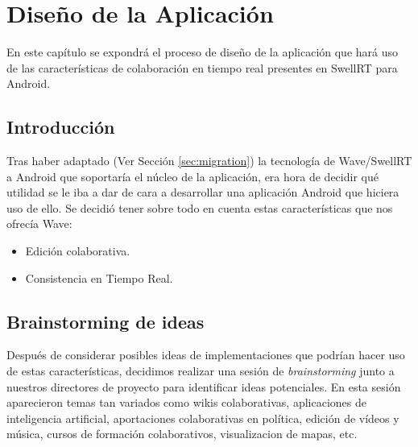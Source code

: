\newpage
\thispagestyle{sectioned}
\chapter{Diseño de la Aplicación}

En este capítulo se expondrá el proceso de diseño de la aplicación que hará uso de las características de colaboración en tiempo real presentes en SwellRT para Android. 

\section{Introducción}

Tras haber adaptado (Ver Sección \ref{sec:migration}) la tecnología de Wave/SwellRT a Android que soportaría el núcleo de la aplicación, era hora de decidir qué utilidad se le iba a dar de cara a desarrollar una aplicación Android que hiciera uso de ello. Se decidió tener sobre todo en cuenta estas características que nos ofrecía Wave:

\begin{itemize}
 \item Edición colaborativa.
 \item Consistencia en Tiempo Real.
\end{itemize}

\section{Brainstorming de ideas} \label{sec:ideaBrain} 

Después de considerar posibles ideas de implementaciones que podrían hacer uso de estas características, decidimos realizar una sesión de \textit{brainstorming} junto a nuestros directores de proyecto para identificar ideas potenciales. En esta sesión aparecieron temas tan variados como wikis colaborativas, aplicaciones de inteligencia artificial, aportaciones colaborativas en política, edición de vídeos y música, cursos de formación colaborativos, visualizacion de mapas, etc.

